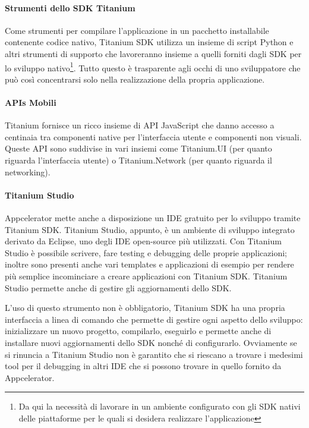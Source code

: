 			\paragraph{Strumenti dello SDK Titanium}
				Come strumenti per compilare l'applicazione in un pacchetto 
				installabile contenente codice nativo, Titanium SDK utilizza un 
				insieme di script Python e altri strumenti di supporto che 
				lavoreranno insieme a quelli forniti dagli SDK per lo sviluppo 
				nativo\footnote{Da qui la necessità di lavorare in un ambiente 
				configurato con gli SDK nativi delle piattaforme per le quali si 
				desidera realizzare l'applicazione}. Tutto questo è trasparente 
				agli occhi di uno sviluppatore che può così concentrarsi solo 
				nella realizzazione della propria applicazione.
				
			\paragraph{APIs Mobili}
				Titanium fornisce un ricco insieme di API JavaScript che danno 
				accesso a centinaia tra componenti native per l'interfaccia 
				utente e componenti non visuali. Queste API sono suddivise in 
				vari insiemi come Titanium.UI (per quanto riguarda l'interfaccia 
				utente) o Titanium.Network (per quanto riguarda il networking).
				 
			\paragraph{Titanium Studio}
				Appcelerator mette anche a disposizione un IDE gratuito per lo 
				sviluppo tramite Titanium SDK. Titanium Studio, appunto, è un 
				ambiente di sviluppo integrato derivato da Eclipse, uno degli 
				IDE open-source più utilizzati. Con Titanium Studio è possibile 
				scrivere, fare testing e debugging delle proprie applicazioni; 
				inoltre sono presenti anche vari templates e applicazioni di 
				esempio per rendere più semplice incominciare a creare 
				applicazioni con Titanium SDK. Titanium Studio permette anche di 
				gestire gli aggiornamenti dello SDK.
				
				L'uso di questo strumento non è obbligatorio, Titanium SDK 
				ha una propria interfaccia a linea di comando che permette di 
				gestire ogni aspetto dello sviluppo: inizializzare un 
				nuovo progetto, compilarlo, eseguirlo e permette anche di 
				installare nuovi aggiornamenti dello SDK nonché di configurarlo.
				Ovviamente se si rinuncia a Titanium Studio non è garantito che 
				si riescano a trovare i medesimi tool per il debugging in altri 
				IDE che si possono trovare in quello fornito da Appcelerator.
				
